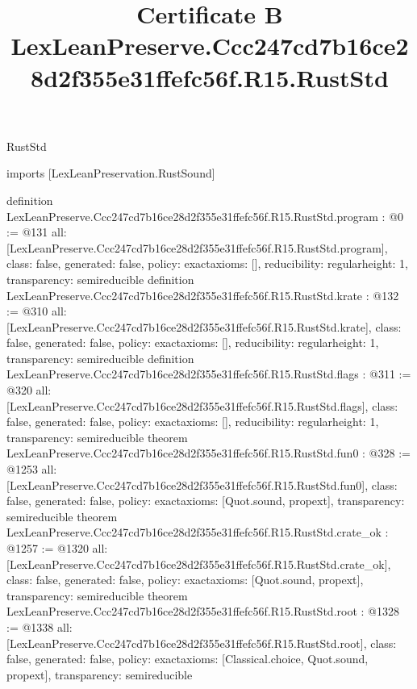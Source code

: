 \begin{lexlean}{RustStd}
\title{Certificate B LexLeanPreserve.Ccc247cd7b16ce28d2f355e31ffefc56f.R15.RustStd}
\begin{coremodule}
imports [LexLeanPreservation.RustSound]

definition LexLeanPreserve.Ccc247cd7b16ce28d2f355e31ffefc56f.R15.RustStd.program : @0 := @131 {
  all: [LexLeanPreserve.Ccc247cd7b16ce28d2f355e31ffefc56f.R15.RustStd.program],
  class: false,
  generated: false,
  policy: exact{axioms: []},
  reducibility: regular{height: 1},
  transparency: semireducible
}
definition LexLeanPreserve.Ccc247cd7b16ce28d2f355e31ffefc56f.R15.RustStd.krate : @132 := @310 {
  all: [LexLeanPreserve.Ccc247cd7b16ce28d2f355e31ffefc56f.R15.RustStd.krate],
  class: false,
  generated: false,
  policy: exact{axioms: []},
  reducibility: regular{height: 1},
  transparency: semireducible
}
definition LexLeanPreserve.Ccc247cd7b16ce28d2f355e31ffefc56f.R15.RustStd.flags : @311 := @320 {
  all: [LexLeanPreserve.Ccc247cd7b16ce28d2f355e31ffefc56f.R15.RustStd.flags],
  class: false,
  generated: false,
  policy: exact{axioms: []},
  reducibility: regular{height: 1},
  transparency: semireducible
}
theorem LexLeanPreserve.Ccc247cd7b16ce28d2f355e31ffefc56f.R15.RustStd.fun0 : @328 := @1253 {
  all: [LexLeanPreserve.Ccc247cd7b16ce28d2f355e31ffefc56f.R15.RustStd.fun0],
  class: false,
  generated: false,
  policy: exact{axioms: [Quot.sound, propext]},
  transparency: semireducible
}
theorem LexLeanPreserve.Ccc247cd7b16ce28d2f355e31ffefc56f.R15.RustStd.crate_ok : @1257 := @1320 {
  all: [LexLeanPreserve.Ccc247cd7b16ce28d2f355e31ffefc56f.R15.RustStd.crate_ok],
  class: false,
  generated: false,
  policy: exact{axioms: [Quot.sound, propext]},
  transparency: semireducible
}
theorem LexLeanPreserve.Ccc247cd7b16ce28d2f355e31ffefc56f.R15.RustStd.root : @1328 := @1338 {
  all: [LexLeanPreserve.Ccc247cd7b16ce28d2f355e31ffefc56f.R15.RustStd.root],
  class: false,
  generated: false,
  policy: exact{axioms: [Classical.choice, Quot.sound, propext]},
  transparency: semireducible
}


\end{coremodule}
\end{lexlean}
